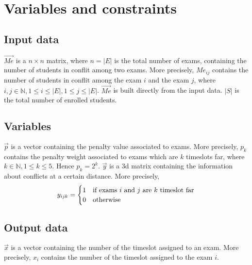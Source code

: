 \section*{Variables and constraints}
\subsection*{Input data}
$ \vec{Me} $ is a $ n \times n $ matrix, where $ n = |E| $ is the total number of exams, containing the number of students in conflit among two exams. More precisely, $ Me_{ij} $ contains the number of students in conflit among the exam $i$ and the exam $j$, where $ i, j \in \mathbb{N}, 1 \le i \le |E|, 1 \le j \le |E| $.
\newline
$ \vec{Me} $ is built directly from the input data.
\newline
$ |S| $ is the total number of enrolled students.

\subsection*{Variables}
$ \vec{p} $ is a vector containing the penalty value associated to exams. More precisely, $ p_{k} $ contains the penalty weight associated to exams which are $k$ timeslots far, where $ k \in \mathbb{N}, 1 \le k \le 5 $. Hence $p_{k} = 2^{k}$.
\newline
$ \vec{y} $ is a 3d matrix containing the information about conflicts at a certain distance. More precisely, 
\[
y_{ijk} = 
\begin{cases}
1	&	\text{if exams $ i $ and $ j $ are $k$ timeslot far}	\\
0	&	\text{otherwise}
\end{cases}
\]

\subsection*{Output data}
$ \vec{x} $ is a vector containing the number of the timeslot assigned to an exam. More precisely, $ x_{i} $ contains the number of the timeslot assigned to the exam $i$.

